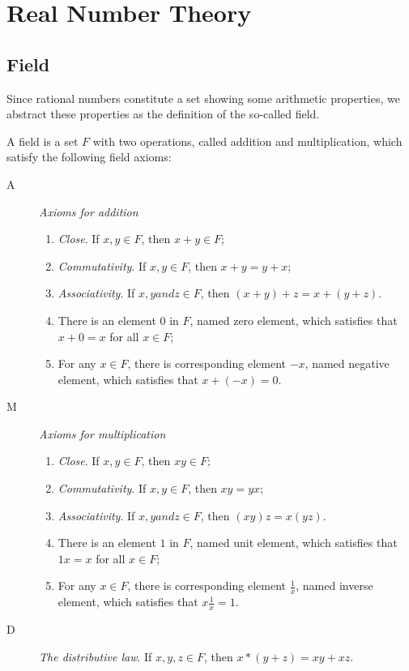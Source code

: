 \chapter{Real Number Theory}
\section{Field}
Since rational numbers constitute a set showing some arithmetic 
properties, we abstract these properties as the definition of the 
so-called field.

\begin{defn}
A field is a set $F$ with two operations, called addition and 
multiplication, which satisfy the following field axioms:
\begin{description}
    \item[A] \emph{Axioms for addition}
    \begin{enumerate}
        \item \emph{Close}. If $x, y \in F$, then $x + y \in F$;
        \item \emph{Commutativity}. If $x, y \in F$, then $x + y = y + x$;
        \item \emph{Associativity}. If $x, y and z \in F$, then 
        $(x + y) + z = x + (y + z)$.
        \item There is an element $0$ in $F$, named zero element, which 
        satisfies that $x + 0 = x$ for all $x \in F$;
        \item For any $x \in F$, there is corresponding element $-x$, named 
        negative element, which satisfies that $x + (-x) = 0$.
    \end{enumerate}
\end{description}
\begin{description}
    \item[M] \emph{Axioms for multiplication}
    \begin{enumerate}
        \item \emph{Close}. If $x, y \in F$, then $xy \in F$;
        \item \emph{Commutativity}. If $x, y \in F$, then $xy = yx$;
        \item \emph{Associativity}. If $x, y and z \in F$, then 
        $(xy)z = x(yz)$.
        \item There is an element $1$ in $F$, named unit element, which 
        satisfies that $1x = x$ for all $x \in F$;
        \item For any $x \in F$, there is corresponding element $\frac{1}{x}$, 
        named inverse element, which satisfies that $x\frac{1}{x} = 1$.
    \end{enumerate}
    \item[D] \emph{The distributive law}. If $x, y, z \in F$, then 
    $x * (y + z) = xy + xz$.
\end{description}
\end{defn}

